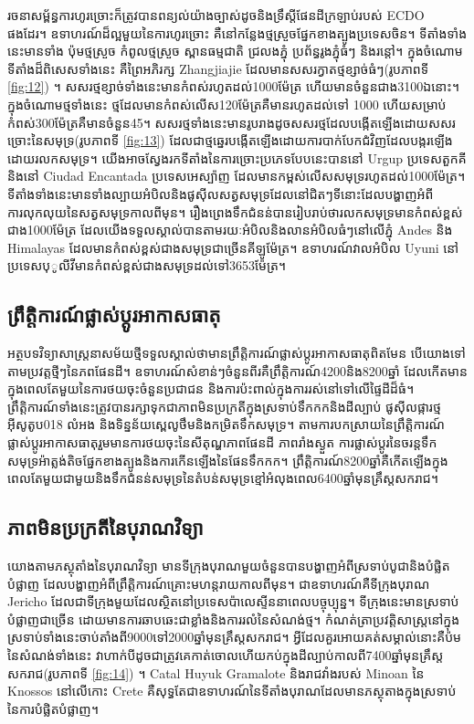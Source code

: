 \documentclass[10pt,twocolumn,letterpaper]{article}
\begin{document}
រចនាសម្ព័ន្ធការហូរច្រោះក៏ត្រូវបានពន្យល់យ៉ាងច្បាស់ដូចនិងទ្រឹស្តីផែនដីក្រឡាប់របស់ ECDO ផងដែរ។ ឧទាហរណ៍ដ៏ល្អមួយនៃការហូរច្រោះ គឺនៅកន្លែងថ្មស្រួចផ្នែកខាងត្បូងប្រទេសចិន\cite{82}។ ទីតាំងទាំងនេះមានទាំង ប៉ុមថ្មស្រួច កំពូលថ្មស្រួច ស្ពានធម្មជាតិ ជ្រលងភ្នុំ ប្រព័ន្ធរូងភ្នុំធំៗ និងរន្តៅ។ ក្នុងចំណោមទីតាំងដ៏ពិសេសទាំងនេះ គឺព្រៃអភិរក្ស Zhangjiajie ដែលមានសសរក្វាតថ្មខ្សាច់ធំៗ(រូបភាពទី \ref{fig:12}) \cite{84}។ សសរថ្មខ្សាច់ទាំងនេះមានកំពស់រហូតដល់1000ម៉ែត្រ ហើយមានចំនួនជាង3100ឯនោះ។ ក្នុងចំណោមថ្មទាំងនេះ ថ្មដែលមានកំពស់លើស120ម៉ែត្រគឺមានរហូតដល់ទៅ 1000 ហើយសម្រាប់កំពស់300ម៉ែត្រគឺមានចំនួន45\cite{85}។ សសរថ្មទាំងនេះមានរូបរាងដូចសសរថ្មដែលបង្កើតឡើងដោយសសរច្រោះនៃសមុទ្រ(រូបភាពទី \ref{fig:13}) ដែលជាថ្មឆ្នេរបង្កើតឡើងដោយការបាក់បែកជំវិញដែលបង្ករឡើងដោយរលកសមុទ្រ។ យើងអាចស្វែងរកទីតាំងនៃការច្រោះប្រភេទបែបនេះបាននៅ Urgup ប្រទេសតួកគី និងនៅ Ciudad Encantada ប្រទេសអេស្ប៉ាញ ដែលមានកម្ពស់លើសសមុទ្ររហូតដល់1000ម៉ែត្រ។ ទីតាំងទាំងនេះមានទាំងល្បាយអំបិលនិងផូសុីលសត្វសមុទ្រដែលនៅជិតៗទីនោះដែលបង្ហាញអំពីការលុកលុយនៃសត្វសមុទ្រកាលពីមុន\cite{15,86,87}។ រឿងព្រេងទឹកជំនន់\cite{3}បានរៀបរាប់ថារលកសមុទ្រមានកំពស់ខ្ពស់ជាង1000ម៉ែត្រ ដែលយើងទទួលស្គាល់បានតាមរយៈអំបិលនិងលានអំបិលធំៗនៅលើភ្នុំ Andes និង Himalayas ដែលមានកំពស់ខ្ពស់ជាងសមុទ្រជាច្រើនគីឡូម៉ែត្រ។ ឧទាហរណ៍វាលអំបិល Uyuni នៅប្រទេសបុូលីវីមានកំពស់ខ្ពស់ជាងសមុទ្រដល់ទៅ3653ម៉ែត្រ\cite{94}។

\subsection{ព្រឹត្តិការណ៍ផ្លាស់ប្ដូរអាកាសធាតុ}

អត្ថបទវិទ្យាសាស្ត្រនាសម័យថ្មីទទួលស្គាល់ថាមានព្រឹត្តិការណ៍ផ្លាស់ប្ដូរអាកាសធាតុពិតមែន បើយោងទៅតាមប្រវត្តថ្មីៗនៃភពផែនដី។ ឧទាហរណ៍សំខាន់ៗចំនួនពីរគឺព្រឹត្តិការណ៍4200និង8200ឆ្នាំ ដែលកើតមានក្នុងពេលតែមួយនៃការថយចុះចំនួនប្រជាជន និងការប៉ះពាល់ក្នុងការរស់នៅទៅលើផ្ទៃដីដ៏ធំ។ ព្រឹត្តិការណ៍ទាំងនេះត្រូវបានរក្សាទុកជាភាពមិនប្រក្រតីក្នុងស្រទាប់ទឹកកកនិងដីល្បាប់ ផូសុីលផ្ការថ្ម អុីសូតូប018 លំអង និងទិន្នន័យស្ពេលូថឹមនិងកម្រិតទឹកសមុទ្រ។ តាមការបកស្រាយនៃព្រឹត្តិការណ៍ផ្លាស់ប្ដូរអាកាសធាតុរួមមានការថយចុះនៃសីតុណ្ហភាពផែនដី ភាពរាំងស្ងួត ការផ្លាស់ប្តូរនៃចរន្តទឹកសមុទ្រអ៉ាត្លង់តិចផ្នែកខាងត្បូងនិងការកើនឡើងនៃផែនទឹកកក\cite{90,91,92}។ ព្រឹត្តិការណ៍8200ឆ្នាំគឺកើតឡើងក្នុងពេលតែមួយជាមួយនិងទឹកជំនន់សមុទ្រនៃតំបន់សមុទ្រខ្មៅអំលុងពេល6400ឆ្នាំមុនគ្រឹស្តសករាជ\cite{93}។

\subsection{ភាពមិនប្រក្រតីនៃបុរាណវិទ្យា}

យោងតាមភស្ថុតាំងនៃបុរាណវិទ្យា មានទីក្រុងបុរាណមួយចំនួនបានបង្ហាញអំពីស្រទាប់បូជានិងបំផ្លិតបំផ្លាញ ដែលបង្ហាញអំពីព្រឹត្តិការណ៍គ្រោះមហន្តរាយកាលពីមុន។ ជាឧទាហរណ៍គឺទីក្រុងបុរាណ Jericho ដែលជាទីក្រុងមួយដែលស្ថិតនៅប្រទេសប៉ាលេស្ទីននាពេលបច្ចុប្បុន្ន។ ទីក្រុងនេះមានស្រទាប់បំផ្លាញជាច្រើន ដោយមានការឆាបឆេះជាខ្លាំងនិងការរលំនៃសំណង់ថ្ម\cite{96,97}។ កំណត់ត្រាប្រវត្តិសាស្ត្រនៅក្នុងស្រទាប់ទាំងនេះចាប់តាំងពី9000ទៅ2000ឆ្នាំមុនគ្រឹស្តសករាជ។ អ្វីដែលគួរអោយគត់សម្គាល់នោះគឺប៉មនៃសំណង់ទាំងនេះ វាហាក់បីដូចជាត្រូវគេកាត់ចោលហើយកប់ក្នុងដីល្បាប់កាលពី7400ឆ្នាំមុនគ្រឹស្តសករាជ(រូបភាពទី \ref{fig:14}) \cite{95}។ Catal Huyuk \cite{99} Gramalote \cite{98} និងរាជវាំងរបស់ Minoan នៃ Knossos នៅលើកោះ Crete \cite{100,101} គឺសុទ្ធតែជាឧទាហរណ៍នៃទីតាំងបុរាណដែលមានភស្ថុតាងក្នុងស្រទាប់នៃការបំផ្លិតបំផ្លាញ។
\end{document}
